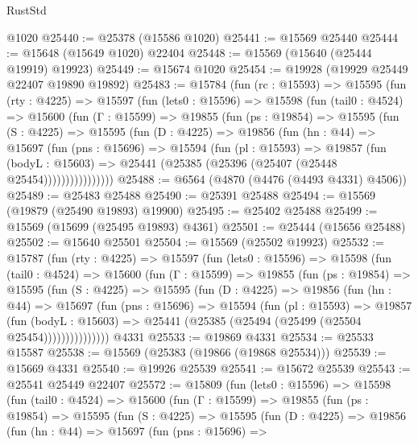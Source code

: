 \begin{lexlean}{RustStd}
\begin{coremodule}
    @1020
@25440 := @25378 (@15586 @1020)
@25441 := @15569 @25440
@25444 := @15648 (@15649 @1020) @22404
@25448 := @15569 (@15640 (@25444 @19919) @19923)
@25449 := @15674 @1020
@25454 := @19928 (@19929 @25449 @22407 @19890 @19892)
@25483 := @15784
    (fun (rc : @15593) =>
    @15595
      (fun (rty : @4225) =>
      @15597
        (fun (lets0 : @15596) =>
        @15598
          (fun (tail0 : @4524) =>
          @15600
            (fun (Γ : @15599) =>
            @19855
              (fun (ps : @19854) =>
              @15595
                (fun (S : @4225) =>
                @15595
                  (fun (D : @4225) =>
                  @19856
                    (fun (hn : @44) =>
                    @15697
                      (fun (pns : @15696) =>
                      @15594
                        (fun (pl : @15593) =>
                        @19857
                          (fun (bodyL : @15603) =>
                          @25441 (@25385 (@25396 (@25407 (@25448 @25454))))))))))))))))
@25488 := @6564 (@4870 (@4476 (@4493 @4331) @4506))
@25489 := @25483 @25488
@25490 := @25391 @25488
@25494 := @15569 (@19879 (@25490 @19893) @19900)
@25495 := @25402 @25488
@25499 := @15569 (@15699 (@25495 @19893) @4361)
@25501 := @25444 (@15656 @25488)
@25502 := @15640 @25501
@25504 := @15569 (@25502 @19923)
@25532 := @15787
    (fun (rty : @4225) =>
    @15597
      (fun (lets0 : @15596) =>
      @15598
        (fun (tail0 : @4524) =>
        @15600
          (fun (Γ : @15599) =>
          @19855
            (fun (ps : @19854) =>
            @15595
              (fun (S : @4225) =>
              @15595
                (fun (D : @4225) =>
                @19856
                  (fun (hn : @44) =>
                  @15697
                    (fun (pns : @15696) =>
                    @15594
                      (fun (pl : @15593) =>
                      @19857
                        (fun (bodyL : @15603) =>
                        @25441 (@25385 (@25494 (@25499 (@25504 @25454)))))))))))))))
    @4331
@25533 := @19869 @4331
@25534 := @25533 @15587
@25538 := @15569 (@25383 (@19866 (@19868 @25534)))
@25539 := @15669 @4331
@25540 := @19926 @25539
@25541 := @15672 @25539
@25543 := @25541 @25449 @22407
@25572 := @15809
    (fun (lets0 : @15596) =>
    @15598
      (fun (tail0 : @4524) =>
      @15600
        (fun (Γ : @15599) =>
        @19855
          (fun (ps : @19854) =>
          @15595
            (fun (S : @4225) =>
            @15595
              (fun (D : @4225) =>
              @19856
                (fun (hn : @44) =>
                @15697
                  (fun (pns : @15696) =>

\end{coremodule}
\end{lexlean}
